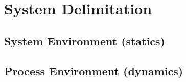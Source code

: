 \section{System Delimitation}

\subsection{System Environment (statics)}


\subsection{Process Environment (dynamics)}


